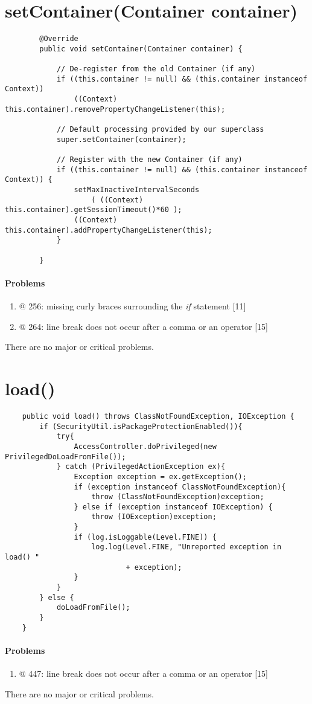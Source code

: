 \section*{setContainer(Container container)}
	
	\lstset{firstnumber=252}
	\begin{lstlisting}
		@Override
		public void setContainer(Container container) {
		
			// De-register from the old Container (if any)
			if ((this.container != null) && (this.container instanceof Context))
				((Context) this.container).removePropertyChangeListener(this);
			
			// Default processing provided by our superclass
			super.setContainer(container);
			
			// Register with the new Container (if any)
			if ((this.container != null) && (this.container instanceof Context)) {
				setMaxInactiveIntervalSeconds
					( ((Context) this.container).getSessionTimeout()*60 );
				((Context) this.container).addPropertyChangeListener(this);
			}
		
		}
	\end{lstlisting}

	\paragraph{Problems}
	\begin{enumerate}
		\item @ 256: missing curly braces surrounding the \textit{if} statement [11]
		\item @ 264: line break does not occur after a comma or an operator [15]
	\end{enumerate}
	
	There are no major or critical problems.

\section*{load()}

	\lstset{firstnumber=435}
	\begin{lstlisting}
	public void load() throws ClassNotFoundException, IOException {
		if (SecurityUtil.isPackageProtectionEnabled()){   
			try{
				AccessController.doPrivileged(new PrivilegedDoLoadFromFile());
			} catch (PrivilegedActionException ex){
				Exception exception = ex.getException();
				if (exception instanceof ClassNotFoundException){
					throw (ClassNotFoundException)exception;
				} else if (exception instanceof IOException) {
					throw (IOException)exception;
				}
				if (log.isLoggable(Level.FINE)) {
					log.log(Level.FINE, "Unreported exception in load() "
							+ exception);
				}
			}
		} else {
			doLoadFromFile();
		}       
	}
	\end{lstlisting}

	\paragraph{Problems}
	\begin{enumerate}
		\item @ 447: line break does not occur after a comma or an operator [15]
	\end{enumerate}
	
	There are no major or critical problems.